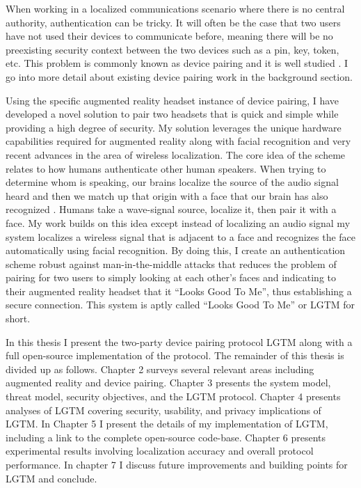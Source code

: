 \documentclass[12pt]{report}
\begin{document}
When working in a localized communications scenario where there is no central authority, authentication can be tricky. It will often be the case that two users have not used their devices to communicate before, meaning there will be no preexisting security context between the two devices such as a pin, key, token, etc. This problem is commonly known as device pairing and it is well studied \cite{ConferenceCompStudySecurePairingKumar2009,VisualChannelPairingSaxena2006,InBandPairingGollaktoa2011,DucklingStajano2000,PlayfulPairingGallego2011,SASVaudenay2005,ManaGehrmann2004,ShakeWellBeforeUseMayrhofer2009,SeeingIsBelievingMcCune2005,TalkingToStrangersSmetters2002,LoudAndClearGoodrich2006,HapadepSoriente2008}. I go into more detail about existing device pairing work in the background section. \par 

Using the specific augmented reality headset instance of device pairing, I have developed a novel solution to pair two headsets that is quick and simple while providing a high degree of security. My solution leverages the unique hardware capabilities required for augmented reality along with facial recognition and very recent advances in the area of wireless localization. The core idea of the scheme relates to how humans authenticate other human speakers. When trying to determine whom is speaking, our brains localize the source of the audio signal heard and then we match up that origin with a face that our brain has also recognized \cite{SoundLocalizationHumanListenersMiddlebrooks1991,FaceVoicePersonPerceptionCampanella2016}. Humans take a wave-signal source, localize it, then pair it with a face. My work builds on this idea except instead of localizing an audio signal my system localizes a wireless signal that is adjacent to a face and recognizes the face automatically using facial recognition. By doing this, I create an authentication scheme robust against man-in-the-middle attacks that reduces the problem of pairing for two users to simply looking at each other's faces and indicating to their augmented reality headset that it ``Looks Good To Me'', thus establishing a secure connection. This system is aptly called ``Looks Good To Me'' or LGTM for short. \par

In this thesis I present the two-party device pairing protocol LGTM along with a full open-source implementation of the protocol. The remainder of this thesis is divided up as follows. Chapter 2 surveys several relevant areas including augmented reality and device pairing. Chapter 3 presents the system model, threat model, security objectives, and the LGTM protocol. Chapter 4 presents analyses of LGTM covering security, usability, and privacy implications of LGTM. In Chapter 5 I present the details of my implementation of LGTM, including a link to the complete open-source code-base. Chapter 6 presents experimental results involving localization accuracy and overall protocol performance. In chapter 7 I discuss future improvements and building points for LGTM and conclude. \par
\end{document}
